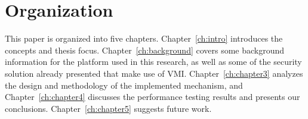 \section{Organization}\label{sec:organization}
This paper is organized into five chapters. Chapter~\ref{ch:intro} introduces the concepts and thesis focus. Chapter~\ref{ch:background} covers some background information for the platform used in this research, as well as some of the security solution already presented that make use of \ac{VMI}. Chapter~\ref{ch:chapter3} analyzes the design and methodology of the implemented mechanism, and Chapter~\ref{ch:chapter4} discusses the performance testing results and presents our conclusions. Chapter~\ref{ch:chapter5} suggests future work.



